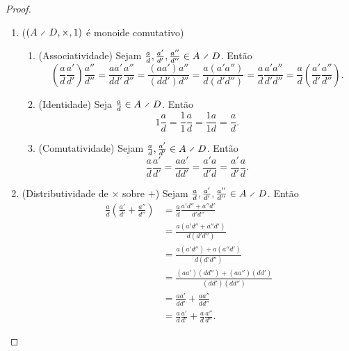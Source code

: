 \begin{proof}
\begin{enumerate}
	\item ($(A \olddiv D,\times,1)$ é monoide comutativo)
		\begin{enumerate}
		\item (Associatividade) Sejam $\frac{a}{d},\frac{a'}{d'},\frac{a''}{d''} \in A \olddiv D$. Então
			\begin{equation*}
			\left( \frac{a}{d}\frac{a'}{d'} \right)\frac{a''}{d''} = \frac{aa'}{dd'}\frac{a''}{d''} = \frac{(aa')a''}{(dd')d''} =  \frac{a(a'a'')}{d(d'd'')} = \frac{a}{d}\frac{a'a''}{d'd''} = \frac{a}{d} \left( \frac{a'}{d'}\frac{a''}{d''} \right).
			\end{equation*}
		
		\item (Identidade) Seja $\frac{a}{d} \in A \olddiv D$. Então
			\begin{equation*}
			1\frac{a}{d} = \frac{1}{1}\frac{a}{d} = \frac{1a}{1d} = \frac{a}{d}.
			\end{equation*}
		
		\item (Comutatividade) Sejam $\frac{a}{d},\frac{a'}{d'} \in A \olddiv D$. Então
			\begin{equation*}
			\frac{a}{d}\frac{a'}{d'}= \frac{aa'}{dd'} = \frac{a'a}{d'd} = \frac{a'}{d'}\frac{a}{d}.
			\end{equation*}
		\end{enumerate}
	
	\item (Distributividade de $\times$ sobre $+$) Sejam $\frac{a}{d},\frac{a'}{d'},\frac{a''}{d''} \in A \olddiv D$. Então
		\begin{align*}
		\frac{a}{d} \left( \frac{a'}{d'} + \frac{a''}{d''} \right) &= \frac{a}{d}\frac{a'd''+a''d'}{d'd''} \\
			&= \frac{a(a'd''+a''d')}{d(d'd'')} \\
			&= \frac{a(a'd'')+a(a''d')}{d(d'd'')} \\
			&= \frac{(aa')(dd'')+(aa'')(dd')}{(dd')(dd'')}  \\
			&= \frac{aa'}{dd'} + \frac{aa''}{dd''}  \\
			&= \frac{a}{d}\frac{a'}{d'} + \frac{a}{d}\frac{a''}{d''}.
		\end{align*}
	\end{enumerate}
\end{proof}

